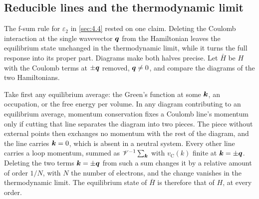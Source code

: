 \subsection{Reducible lines and the thermodynamic limit}\label{sec:4.8-removal}

The f-sum rule for $\varepsilon_2$ in \cref{sec:4.4} rested on one claim. Deleting the Coulomb interaction at the single wavevector $\bm{q}$ from the Hamiltonian leaves the equilibrium state unchanged in the thermodynamic limit, while it turns the full response into its proper part. Diagrams make both halves precise. Let $\bar H$ be $H$ with the Coulomb terms at $\pm\bm{q}$ removed, $\bm{q} \ne 0$, and compare the diagrams of the two Hamiltonians.

Take first any equilibrium average: the Green's function at some $\bm{k}$, an occupation, or the free energy per volume. In any diagram contributing to an equilibrium average, momentum conservation fixes a Coulomb line's momentum only if cutting that line separates the diagram into two pieces. The piece without external points then exchanges no momentum with the rest of the diagram, and the line carries $\bm{k} = 0$, which is absent in a neutral system. Every other line carries a loop momentum, summed as $\mathscr{V}^{-1}\sum_{\bm{k}}$ with $v_{\mathrm{C}}(k)$ finite at $\bm{k} = \pm\bm{q}$. Deleting the two terms $\bm{k} = \pm\bm{q}$ from such a sum changes it by a relative amount of order $1/N$, with $N$ the number of electrons, and the change vanishes in the thermodynamic limit. The equilibrium state of $\bar H$ is therefore that of $H$, at every order.

